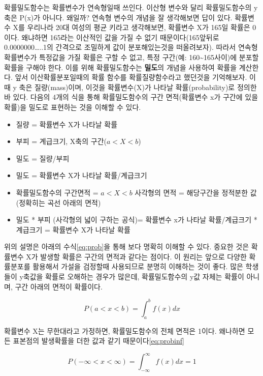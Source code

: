 \documentclass[
]{book}
\begin{document}
확률밀도함수는 확률변수가 연속형일때 쓰인다. 이산형 변수와 달리 확률밀도함수의 y축은
P(x)가 아니다. 왜일까? 연속형 변수의 개념을 잘 생각해보면 답이 있다. 확률변수 X를 우리나라 20대 여성의 평균 키라고 생각해보면, 확률변수 X가 165일 확률은 0이다. 왜냐하면 165라는 이산적인 값을 가질 수 없기 때문이다(165앞뒤로 0.0000000\ldots..1의 간격으로 조밀하게 값이 분포해있는것을 떠올려보자). 따라서 연속형 확률변수가 특정값을 가질 확률은 구할 수 없고, 특정 구간(예: 160\textasciitilde165사이)에 분포할 확률을 구해야 한다.
이를 위해 확률밀도함수는 \textbf{밀도}의 개념을 사용하여 확률을 계산한다. 앞서 이산확률분포일때의 확률 함수를 확률질량함수라고 했던것을 기억해보자. 이때 y 축은 질량(mass)이며, 이것을 확률변수(X)가 나타날 확률(probability)로 정의한 바 있다. 다음의 4개의 식을 통해 확률밀도함수의 구간 면적(확률변수 x가 구간에 있을 확률)을 밀도로 표현하는 것을 이해할 수 있다.

\begin{itemize}
\item
  질량 = 확률변수 X가 나타날 확률
\item
  부피 = 계급크기, X축의 구간(\(a<X<b\))
\item
  밀도 = 질량/부피
\item
  밀도 = 확률변수 X가 나타날 확률/계급크기
\item
  확률밀도함수의 구간면적 = \(a<X<b\) 사각형의 면적 = 해당구간을 정적분한 값 (정확히는 곡선 아래의 면적)
\item
  밀도 * 부피 (사각형의 넓이 구하는 공식)= 확률변수 x가 나타날 확률/계급크기 * 계급크기 = 확률변수 X가 나타날 확률
\end{itemize}

위의 설명은 아래의 수식\eqref{eq:prob}을 통해 보다 명확히 이해할 수 있다. 중요한 것은 확률변수 X가 발생할 확률은 구간의 면적과 같다는 점이다. 이 원리는 앞으로 다양한 확률분포를 활용해서 가설을 검정할때 사용되므로 분명히 이해하는 것이 좋다. 많은 학생들이 y축값을 확률로 오해하는 경우가 많은데, 확률밀도함수의 y값 자체는 확률이 아니며, 구간 아래의 면적이 확률이다.

\begin{equation}
P(a<x<b)=\int_{a}^{b}f(x)dx
\label{eq:prob}
\end{equation}

확률변수 X는 무한대라고 가정하면, 확률밀도함수의 전체 면적은 1이다. 왜나하면 모든 표본점의 발생확률을 더한 값과 같기 때문이다\eqref{eq:probinf}

\begin{equation}
P(-\infty <x<\infty)=\int_{-\infty}^{\infty}f(x)dx =1
\label{eq:probinf}
\end{equation}
\end{document}
